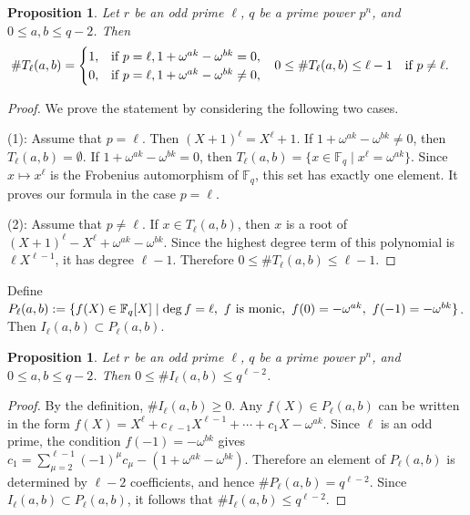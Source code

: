 \documentclass[10pt,a4paper]{article}
\newtheorem{prop}[thm]{Proposition}
\numberwithin{equation}{section}
\begin{document}
\begin{prop}\label{lem:T-bound-odd-prime-general}
Let $r$ be an odd prime $\ell$, $q$ be a prime power $p^n$, and $0\le a,b\le q-2$. Then
\[
\begin{aligned}
\#T_{\ell}(a,b)&=
\begin{cases}
1, & \textup{if }p=\ell,  1+\omega^{ak}-\omega^{bk}=0,\\
0, & \textup{if }p=\ell,  1+\omega^{ak}-\omega^{bk}\neq0,
\end{cases}
&
0\le \#T_{\ell}(a,b)&\le \ell-1
\quad \textup{if }p\neq\ell.
\end{aligned}
\]
\end{prop}

\begin{proof}
We prove the statement by considering the following two cases.

\noindent\textup{(1)}: Assume that $p=\ell$. Then $(X+1)^\ell=X^\ell+1$. If $1+\omega^{ak}-\omega^{bk}\neq0$, then $T_{\ell}(a,b)=\emptyset$. If $1+\omega^{ak}-\omega^{bk}=0$, then $T_{\ell}(a,b)=\{x\in\mathbb{F}_q\mid x^\ell=\omega^{ak}\}$. Since $x\mapsto x^\ell$ is the Frobenius automorphism of $\mathbb{F}_q$, this set has exactly one element. It proves our formula in the case $p=\ell$.

\noindent\textup{(2)}: Assume that $p\neq\ell$. If $x\in T_{\ell}(a,b)$, then $x$ is a root of $(X+1)^\ell-X^\ell+\omega^{ak}-\omega^{bk}$. Since the highest degree term of this polynomial is $\ell X^{\ell-1}$, it has degree $\ell-1$. Therefore $0\le \#T_{\ell}(a,b)\le \ell-1$.
\end{proof}

Define
$P_{\ell}(a,b):=\{f(X)\in \mathbb{F}_q[X]\mid \deg f=\ell,\ f \textup{ is monic},\ f(0)=-\omega^{ak},\ f(-1)=-\omega^{bk}\}$.
Then $I_{\ell}(a,b)\subset P_{\ell}(a,b)$.

\begin{prop}\label{lem:I-bound-odd-prime-general}
Let $r$ be an odd prime $\ell$, $q$ be a prime power $p^n$, and $0\le a,b\le q-2$. Then $0\le \#I_{\ell}(a,b)\le q^{\ell-2}$.
\end{prop}

\begin{proof}
By the definition, $\#I_{\ell}(a,b)\ge 0$. Any $f(X)\in P_{\ell}(a,b)$ can be written in the form $f(X)=X^\ell+c_{\ell-1}X^{\ell-1}+\cdots+c_1X-\omega^{ak}$. Since $\ell$ is an odd prime, the condition $f(-1)=-\omega^{bk}$ gives $c_1=\sum_{\mu=2}^{\ell-1}(-1)^\mu c_\mu-(1+\omega^{ak}-\omega^{bk})$. Therefore an element of $P_{\ell}(a,b)$ is determined by $\ell-2$ coefficients, and hence $\#P_{\ell}(a,b)=q^{\ell-2}$. Since $I_{\ell}(a,b)\subset P_{\ell}(a,b)$, it follows that $\#I_{\ell}(a,b)\le q^{\ell-2}$.
\end{proof}
\end{document}
